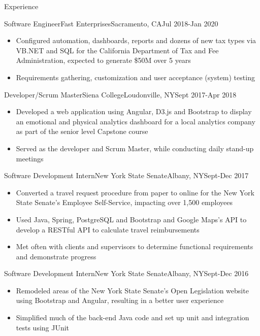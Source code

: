 \documentclass[]{xjavathehutt}
\begin{document}
\makeheader


\begin{cvsection}{Experience}
  \begin{cvsubsection}{Software Engineer}{Fast Enterprises}{Sacramento, CA}{Jul 2018-Jan 2020}
    \begin{itemize}
      \item{Configured automation, dashboards, reports and dozens of new tax types via VB.NET and SQL for the California Department of Tax and Fee Administration, expected
      to generate \$50M over 5 years}
      \item{Requirements gathering, customization and user acceptance (system) testing}
    \end{itemize}
  \end{cvsubsection}

  \begin{cvsubsection}{Developer/Scrum Master}{Siena College}{Loudonville, NY}{Sept 2017-Apr 2018}
    \begin{itemize}
      \item{Developed a web application using Angular, D3.js and Bootstrap to display an emotional and physical
          analytics dashboard for a local analytics company as part of the senior level Capstone course}
      \item{Served as the developer and Scrum Master, while conducting daily stand-up meetings}
    \end{itemize}
  \end{cvsubsection}

  \begin{cvsubsection}{Software Development Intern}{New York State Senate}{Albany, NY}{Sept-Dec 2017}
    \begin{itemize}
      \item{Converted a travel request procedure from paper to online for the New York
        State Senate's Employee Self-Service, impacting over 1,500 employees}
      \item{Used Java, Spring, PostgreSQL and Bootstrap and Google Maps's API to develop a RESTful API to calculate travel reimbursements}
      \item{Met often with clients and supervisors to determine functional requirements and demonstrate progress}
    \end{itemize}
  \end{cvsubsection}

  \begin{cvsubsection}{Software Development Intern}{New York State Senate}{Albany, NY}{Sept-Dec 2016}
    \begin{itemize}
      \item{Remodeled areas of the New York State Senate's Open Legislation website using Bootstrap
        and Angular, resulting in a better user experience}
      \item{Simplified much of the back-end Java code and set up unit and integration tests using
        JUnit}
    \end{itemize}
  \end{cvsubsection}
\end{cvsection}
\end{document}
